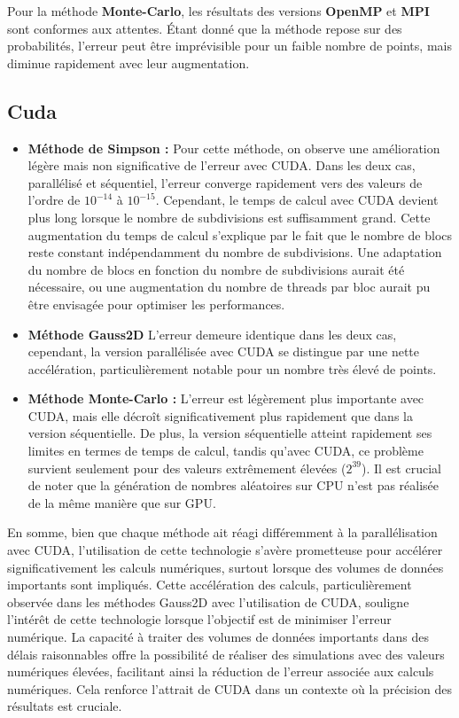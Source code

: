 \documentclass[10pt,a4paper]{article}
\begin{document}
Pour la méthode \textbf{Monte-Carlo}, les résultats des versions \textbf{OpenMP} et \textbf{MPI} sont conformes aux attentes. Étant donné que la méthode repose sur des probabilités, l'erreur peut être imprévisible pour un faible nombre de points, mais diminue rapidement avec leur augmentation.

\subsection*{Cuda}
\begin{itemize}
    \item \textbf{Méthode de Simpson :} Pour cette méthode, on observe une amélioration légère mais non significative de l'erreur avec CUDA. Dans les deux cas, parallélisé et séquentiel, l'erreur converge rapidement vers des valeurs de l'ordre de $10^{-14}$ à $10^{-15}$. Cependant, le temps de calcul avec CUDA devient plus long lorsque le nombre de subdivisions est suffisamment grand. Cette augmentation du temps de calcul s'explique par le fait que le nombre de blocs reste constant indépendamment du nombre de subdivisions. Une adaptation du nombre de blocs en fonction du nombre de subdivisions aurait été nécessaire, ou une augmentation du nombre de threads par bloc aurait pu être envisagée pour optimiser les performances.
    \item \textbf{Méthode Gauss2D} L'erreur demeure identique dans les deux cas, cependant, la version parallélisée avec CUDA se distingue par une nette accélération, particulièrement notable pour un nombre très élevé de points.
    \item \textbf{Méthode Monte-Carlo :} L'erreur est légèrement plus importante avec CUDA, mais elle décroît significativement plus rapidement que dans la version séquentielle. De plus, la version séquentielle atteint rapidement ses limites en termes de temps de calcul, tandis qu'avec CUDA, ce problème survient seulement pour des valeurs extrêmement élevées ($2^{39}$). Il est crucial de noter que la génération de nombres aléatoires sur CPU n'est pas réalisée de la même manière que sur GPU.
\end{itemize}
En somme, bien que chaque méthode ait réagi différemment à la parallélisation avec CUDA, l'utilisation de cette technologie s'avère prometteuse pour accélérer significativement les calculs numériques, surtout lorsque des volumes de données importants sont impliqués. Cette accélération des calculs, particulièrement observée dans les méthodes Gauss2D avec l'utilisation de CUDA, souligne l'intérêt de cette technologie lorsque l'objectif est de minimiser l'erreur numérique. La capacité à traiter des volumes de données importants dans des délais raisonnables offre la possibilité de réaliser des simulations avec des valeurs numériques élevées, facilitant ainsi la réduction de l'erreur associée aux calculs numériques. Cela renforce l'attrait de CUDA dans un contexte où la précision des résultats est cruciale.
\end{document}
